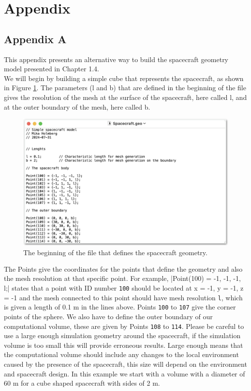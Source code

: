 \documentclass[a4paper, 12pt]{article}
\begin{document}
\newpage
\section{Appendix}
\subsection{Appendix A}

This appendix presents an alternative way to build the spacecraft geometry model presented in Chapter 1.4.\\

We will begin by building a simple cube that represents the spacecraft, as shown in Figure \ref{A1}. The parameters (l and b) that are defined in the beginning of the file gives the resolution of the mesh at the surface of the spacecraft, here called l, and at the outer boundary of the mesh, here called b.\par

\begin{figure}[!ht]
    \centering
    \includegraphics[width=1\textwidth]{figA1.jpg}
    \caption{The beginning of the file that defines the spacecraft geometry.}
    \label{A1}
\end{figure}

The Points give the coordinates for the points that define the geometry and also the mesh resolution at that specific point. For example, |Point(100) = {-1, -1, -1, l};| states that a point with ID number \verb|100| should be located at x = -1, y = -1, z = -1 and the mesh connected to this point should have mesh resolution \verb|l|, which is given a length of 0.1 m in the lines above. Points \verb|100| to \verb|107| give the corner points of the sphere. We also have to define the outer boundary of our computational volume, these are given by Points \verb|108| to \verb|114|. Please be careful to use a large enough simulation geometry around the spacecraft, if the simulation volume is too small this will provide erroneous results. Large enough means that the computational volume should include any changes to the local environment caused by the presence of the spacecraft, this size will depend on the environment and spacecraft design. In this example we start with a volume with a diameter of 60 m for a cube shaped spacecraft with sides of 2 m.\\
\end{document}
